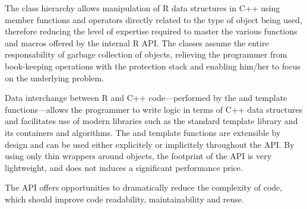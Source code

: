 The class hierarchy allows manipulation of R data structures in C++ 
using member functions and operators directly related to the type
of object being used, therefore reducing the level of expertise
required to master the various functions and macros offered by the
internal R API. The classes assume the entire 
responsability of garbage collection of objects, relieving the 
programmer from book-keeping operations with the protection stack 
and enabling him/her to focus on the underlying problem. 

Data interchange between R and C++ code---performed by the  and
 template functions---allows the programmer to write logic in terms
of C++ data structures and facilitates use of modern libraries such as the
standard template library and its containers and algorithms. The
 and  template functions are extensible by design and
can be used either explicitely or implicitely throughout the API.
By using only thin wrappers around  objects, 
the footprint of the  API is very lightweight, and does not 
induces a significant performance price. 

The  API offers opportunities to dramatically reduce the complexity 
of code, which should improve code readability, maintainability and reuse.



\address{Dirk Eddelbuettel\\
  Debian Project\\
  Chicago, IL\\
  USA}\\

\address{Romain Fran\c{c}ois\\
  Professionnal R Enthusiast\\
  3 rue Emile Bonnet, 34 090 Montpellier\\
  FRANCE}\\

